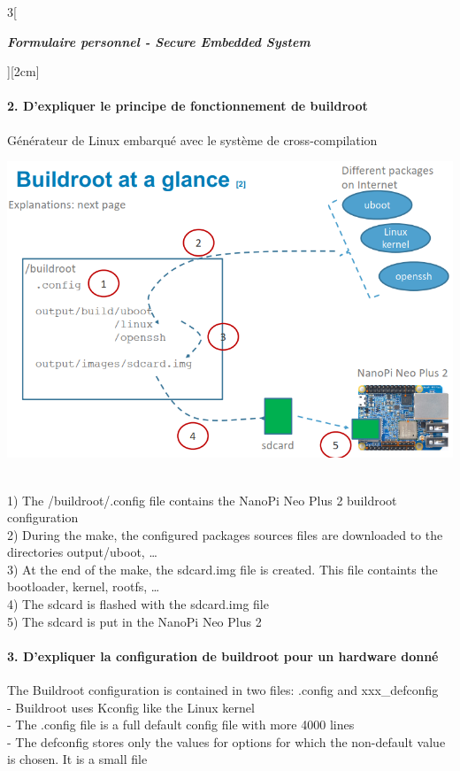 \begin{multicols}{3}[\centerline{ \large\em \textbf{Formulaire personnel - Secure Embedded System}}][2cm]
\paragraph*{2. D’expliquer le principe de fonctionnement de buildroot\\}
Générateur de Linux embarqué avec le système de cross-compilation\\
\begin{minipage}{\linewidth}
	\centering
    \includegraphics[width =0.8\columnwidth]{images/3.png}
\end{minipage}\\
1) The /buildroot/.config file contains the NanoPi Neo Plus 2 buildroot configuration\\
2) During the make, the configured packages sources files are downloaded to the
directories output/uboot, …\\
3) At the end of the make, the sdcard.img file is created. This file containts the bootloader, kernel, rootfs, …\\
4) The sdcard is flashed with the sdcard.img file\\
5) The sdcard is put in the NanoPi Neo Plus 2\\
\paragraph*{3. D’expliquer la configuration de buildroot pour un hardware donné\\}
The Buildroot configuration is contained in two files: .config and xxx\_defconfig\\
- Buildroot uses Kconfig like the Linux kernel\\
- The .config file is a full default config file with more 4000 lines\\
- The defconfig stores only the values for options for which the non-default value is chosen. It is a small file \\

\end{multicols}
